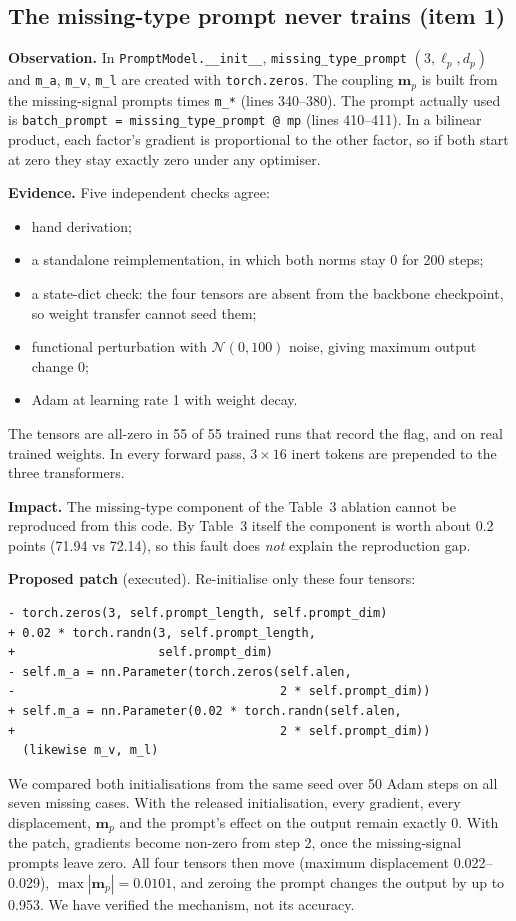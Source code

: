 \documentclass[lettersize,journal]{IEEEtran}
\begin{document}
\subsection{The missing-type prompt never trains (item 1)}
\textbf{Observation.} In \texttt{PromptModel.\_\_init\_\_}, \texttt{missing\_type\_prompt} $(3,\ell_p,d_p)$ and \texttt{m\_a}, \texttt{m\_v}, \texttt{m\_l} are created with \texttt{torch.zeros}. The coupling $\mathbf{m}_p$ is built from the missing-signal prompts times \texttt{m\_*} (lines 340--380). The prompt actually used is \texttt{batch\_prompt = missing\_type\_prompt @ mp} (lines 410--411). In a bilinear product, each factor's gradient is proportional to the other factor, so if both start at zero they stay exactly zero under any optimiser.

\textbf{Evidence.} Five independent checks agree:
\begin{itemize}
\item hand derivation;
\item a standalone reimplementation, in which both norms stay 0 for 200 steps;
\item a state-dict check: the four tensors are absent from the backbone checkpoint, so weight transfer cannot seed them;
\item functional perturbation with $\mathcal{N}(0,100)$ noise, giving maximum output change $0$;
\item Adam at learning rate 1 with weight decay.
\end{itemize}
The tensors are all-zero in 55 of 55 trained runs that record the flag, and on real trained weights. In every forward pass, $3\times16$ inert tokens are prepended to the three transformers.

\textbf{Impact.} The missing-type component of the Table~3 ablation cannot be reproduced from this code. By Table~3 itself the component is worth about 0.2 points (71.94 vs 72.14), so this fault does \emph{not} explain the reproduction gap.

\textbf{Proposed patch} (executed). Re-initialise only these four tensors:
\begin{Verbatim}
- torch.zeros(3, self.prompt_length, self.prompt_dim)
+ 0.02 * torch.randn(3, self.prompt_length,
+                    self.prompt_dim)
- self.m_a = nn.Parameter(torch.zeros(self.alen,
-                                     2 * self.prompt_dim))
+ self.m_a = nn.Parameter(0.02 * torch.randn(self.alen,
+                                     2 * self.prompt_dim))
  (likewise m_v, m_l)
\end{Verbatim}
We compared both initialisations from the same seed over 50 Adam steps on all seven missing cases. With the released initialisation, every gradient, every displacement, $\mathbf{m}_p$ and the prompt's effect on the output remain exactly 0. With the patch, gradients become non-zero from step 2, once the missing-signal prompts leave zero. All four tensors then move (maximum displacement 0.022--0.029), $\max|\mathbf{m}_p|=0.0101$, and zeroing the prompt changes the output by up to 0.953. We have verified the mechanism, not its accuracy.
\end{document}
